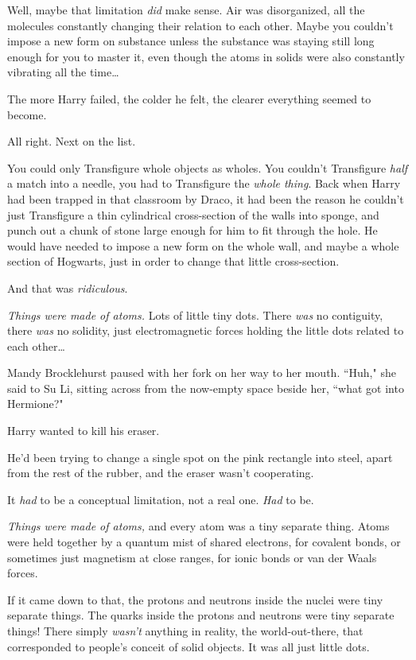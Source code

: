 Well, maybe that limitation \emph{did} make sense. Air was disorganized, all the molecules constantly changing their relation to each other. Maybe you couldn't impose a new form on substance unless the substance was staying still long enough for you to master it, even though the atoms in solids were also constantly vibrating all the time{\ldots}

The more Harry failed, the colder he felt, the clearer everything seemed to become.

All right. Next on the list.

You could only Transfigure whole objects as wholes. You couldn't Transfigure \emph{half} a match into a needle, you had to Transfigure the \emph{whole thing}. Back when Harry had been trapped in that classroom by Draco, it had been the reason he couldn't just Transfigure a thin cylindrical cross-section of the walls into sponge, and punch out a chunk of stone large enough for him to fit through the hole. He would have needed to impose a new form on the whole wall, and maybe a whole section of Hogwarts, just in order to change that little cross-section.

And that was \emph{ridiculous}.

\emph{Things were made of atoms.} Lots of little tiny dots. There \emph{was} no contiguity, there \emph{was} no solidity, just electromagnetic forces holding the little dots related to each other{\ldots}

\later

Mandy Brocklehurst paused with her fork on her way to her mouth. ``Huh," she said to Su Li, sitting across from the now-empty space beside her, ``what got into Hermione?"

\later

Harry wanted to kill his eraser.

He'd been trying to change a single spot on the pink rectangle into steel, apart from the rest of the rubber, and the eraser wasn't cooperating.

It \emph{had} to be a conceptual limitation, not a real one. \emph{Had} to be.

\emph{Things were made of atoms,} and every atom was a tiny separate thing. Atoms were held together by a quantum mist of shared electrons, for covalent bonds, or sometimes just magnetism at close ranges, for ionic bonds or van der Waals forces.

If it came down to that, the protons and neutrons inside the nuclei were tiny separate things. The quarks inside the protons and neutrons were tiny separate things! There simply \emph{wasn't} anything in reality, the world-out-there, that corresponded to people's conceit of solid objects. It was all just little dots.


